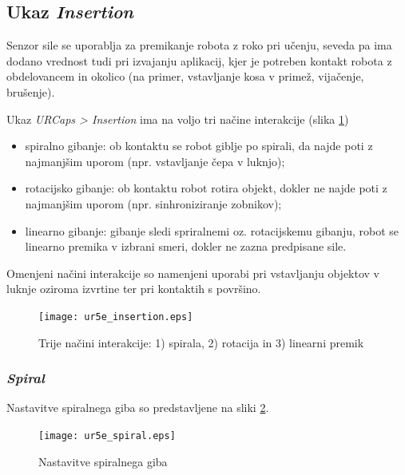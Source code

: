 \newpage

\subsection{Ukaz \emph{Insertion}}

Senzor sile se  uporablja za premikanje robota z roko pri učenju, seveda pa ima dodano vrednost tudi pri izvajanju aplikacij, kjer je potreben kontakt robota z obdelovancem in okolico (na primer, vstavljanje kosa v primež, vijačenje, brušenje).

Ukaz \emph{URCaps > Insertion} ima na voljo tri načine interakcije (slika \ref{fig:ur_insertion})
\begin{itemize}
  \item spiralno gibanje: ob kontaktu se robot giblje po spirali, da najde poti z najmanjšim uporom (npr. vstavljanje čepa v luknjo);
  \item rotacijsko gibanje: ob kontaktu robot rotira objekt, dokler ne najde poti z najmanjšim uporom (npr. sinhroniziranje zobnikov);
  \item linearno gibanje: gibanje sledi spriralnemi oz. rotacijskemu gibanju, robot se linearno premika v izbrani smeri, dokler ne zazna predpisane sile.
\end{itemize}
Omenjeni načini interakcije so namenjeni uporabi pri vstavljanju objektov v luknje oziroma izvrtine ter pri kontaktih s površino.

\begin{figure}[!hbt]
\centering
\texttt{[image: ur5e\_insertion.eps]}
\caption{Trije načini interakcije: 1) spirala, 2) rotacija in 3) linearni premik}
\label{fig:ur_insertion}
\end{figure}


\subsubsection{\emph{Spiral}}

Nastavitve spiralnega giba so predstavljene na sliki \ref{fig:ur_spir}.
\begin{figure}[!hbt]
\centering
\texttt{[image: ur5e\_spiral.eps]}
\caption{Nastavitve spiralnega giba}
\label{fig:ur_spir}
\end{figure}

